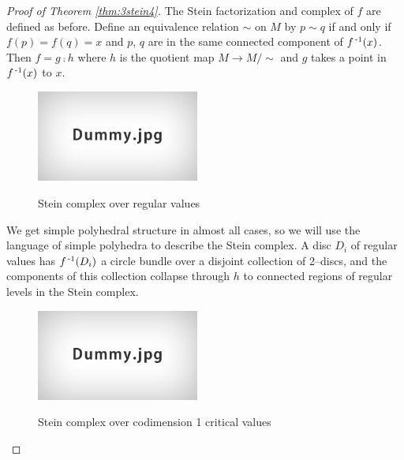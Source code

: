 \begin{proof}[Proof of Theorem \ref{thm:3stein4}]
	The Stein factorization and complex of $f$ are defined as before.
	Define an equivalence relation $\sim$ on $M$ by $p\sim q$ if and only if $f(p)=f(q)=x$ and $p$, $q$ are in the same connected component of $f^{\,\text{-}1}(x)$.
	Then $f=g\comp h$ where $h$ is the quotient map $M\to M/\!\!\sim$ and $g$ takes a point in $f^{\,\text{-}1}(x)$ to $x$.
	
	\begin{figure}
		\centering
		\captionsetup{justification=centering}
		\caption{Stein complex over regular values}
		\includegraphics[height=3cm]{figures/dummy.jpg}
		\label{fig:regstein}
	\end{figure}
	
	We get simple polyhedral structure in almost all cases, so we will use the language of simple polyhedra to describe the Stein complex.
	A disc $D_i$ of regular values has $f^{\,\text{-}1}(D_i)$ a circle bundle over a disjoint collection of 2--discs, and the components of this collection collapse through $h$ to connected regions of regular levels in the Stein complex.
	
	\begin{figure}
		\centering
		\captionsetup{justification=centering}
		\caption{Stein complex over codimension 1 critical values}
		\includegraphics[height=3cm]{figures/dummy.jpg}
		\label{fig:codim1stein}
	\end{figure}	
	

\end{proof}
